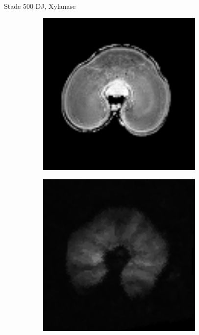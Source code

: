 \documentclass[10pt]{beamer}
\begin{document}
\begin{frame}{Stade 500 DJ, Xylanase}
  \begin{figure}[ht]
    \centering
    \begin{subfigure}[t]{0.33\textwidth}
      \centering
      \includegraphics[width=0.9\textwidth]{fig/stats_500Xyl_density_irm}
    \end{subfigure}%
    \begin{subfigure}[t]{0.33\textwidth}
      \centering
      \includegraphics[width=0.9\textwidth]{fig/stats_500Xyl_density}
    \end{subfigure}%
    
  \end{figure}
  

 
\end{frame}
\end{document}

